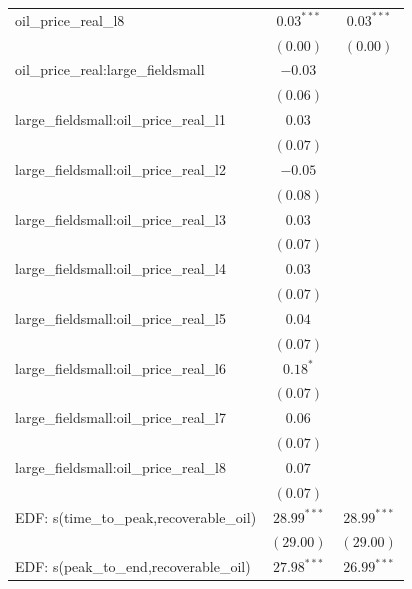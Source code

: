 \documentclass[12pt]{article}
\begin{document}
\begin{table}
\begin{center}
\begin{tabular}{l c c }
oil_price_real_l8                    & $0.03^{***}$     & $0.03^{***}$     \\
                                     & $(0.00)$         & $(0.00)$         \\
oil_price_real:large_fieldsmall      & $-0.03$          &                  \\
                                     & $(0.06)$         &                  \\
large_fieldsmall:oil_price_real_l1   & $0.03$           &                  \\
                                     & $(0.07)$         &                  \\
large_fieldsmall:oil_price_real_l2   & $-0.05$          &                  \\
                                     & $(0.08)$         &                  \\
large_fieldsmall:oil_price_real_l3   & $0.03$           &                  \\
                                     & $(0.07)$         &                  \\
large_fieldsmall:oil_price_real_l4   & $0.03$           &                  \\
                                     & $(0.07)$         &                  \\
large_fieldsmall:oil_price_real_l5   & $0.04$           &                  \\
                                     & $(0.07)$         &                  \\
large_fieldsmall:oil_price_real_l6   & $0.18^{*}$       &                  \\
                                     & $(0.07)$         &                  \\
large_fieldsmall:oil_price_real_l7   & $0.06$           &                  \\
                                     & $(0.07)$         &                  \\
large_fieldsmall:oil_price_real_l8   & $0.07$           &                  \\
                                     & $(0.07)$         &                  \\
EDF: s(time_to_peak,recoverable_oil) & $28.99^{***}$    & $28.99^{***}$    \\
                                     & $(29.00)$        & $(29.00)$        \\
EDF: s(peak_to_end,recoverable_oil)  & $27.98^{***}$    & $26.99^{***}$    \\

\end{tabular}
\end{center}
\end{table}
\end{document}
